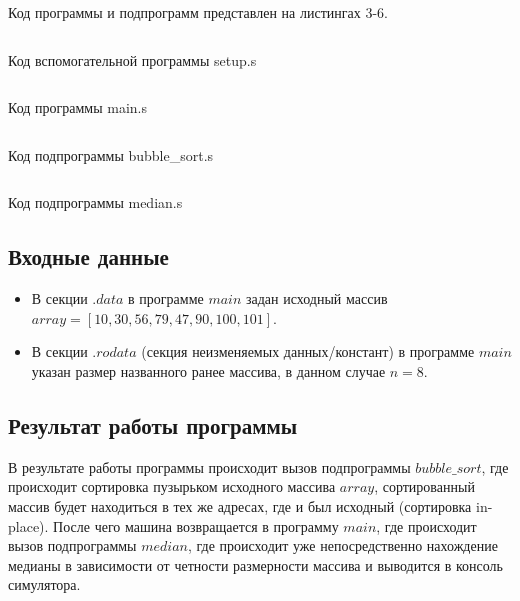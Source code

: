 Код программы и подпрограмм представлен на листингах 3-6.

\begin{code}
	\inputminted[breaklines=true, xleftmargin=1em, linenos, frame=single, framesep=10pt, fontsize=\footnotesize, firstline=1]{asm}{listings/setup.s}
	\caption{Код вспомогательной программы setup.s}
\end{code}

\begin{code}
	\inputminted[breaklines=true, xleftmargin=1em, linenos, frame=single, framesep=10pt, fontsize=\footnotesize, firstline=1]{asm}{listings/main.s}
	\caption{Код программы main.s}
\end{code}

\begin{code}
	\inputminted[breaklines=true, xleftmargin=1em, linenos, frame=single, framesep=10pt, fontsize=\footnotesize, firstline=1]{asm}{listings/bubble_sort.s}
	\caption{Код подпрограммы bubble\_sort.s}
\end{code}

\begin{code}
	\inputminted[breaklines=true, xleftmargin=1em, linenos, frame=single, framesep=10pt, fontsize=\footnotesize, firstline=1]{asm}{listings/median.s}
	\caption{Код подпрограммы median.s}
\end{code}

\subsection{Входные данные}

\begin{itemize}
	\item В секции \(.data\) в программе \(main\) задан исходный массив \(array = [10, 30, 56, 79, 47, 90, 100, 101]\).
	\item В секции \(.rodata\) (секция неизменяемых данных/констант) в программе \(main\) указан размер названного ранее массива, в данном случае \(n = 8\).
\end{itemize}

\subsection{Результат работы программы}
В результате работы программы происходит вызов подпрограммы \(bubble\_sort\), где происходит сортировка пузырьком исходного массива \(array\), сортированный массив будет находиться в тех же адресах, где и был исходный (сортировка in-place). После чего машина возвращается в программу \(main\), где происходит вызов подпрограммы \(median\), где происходит уже непосредственно нахождение медианы в зависимости от четности размерности массива и выводится в консоль симулятора.

